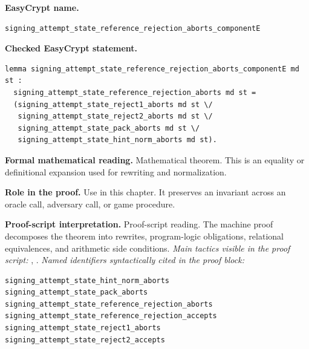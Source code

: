 \begin{formaltheorem}
\noindent\textbf{EasyCrypt name.}
\begin{lstlisting}[language=EasyCrypt,basicstyle=\ttfamily\scriptsize]
signing_attempt_state_reference_rejection_aborts_componentE
\end{lstlisting}
\noindent\textbf{Checked EasyCrypt statement.}
\begin{lstlisting}[language=EasyCrypt,basicstyle=\ttfamily\scriptsize]
lemma signing_attempt_state_reference_rejection_aborts_componentE md st :
  signing_attempt_state_reference_rejection_aborts md st =
  (signing_attempt_state_reject1_aborts md st \/
   signing_attempt_state_reject2_aborts md st \/
   signing_attempt_state_pack_aborts md st \/
   signing_attempt_state_hint_norm_aborts md st).
\end{lstlisting}
\noindent\textbf{Formal mathematical reading.}
Mathematical theorem. This is an equality or definitional expansion used for rewriting and normalization.

\noindent\textbf{Role in the proof.}
Use in this chapter. It preserves an invariant across an oracle call, adversary call, or game procedure.

\noindent\textbf{Proof-script interpretation.}
Proof-script reading. The machine proof decomposes the theorem into rewrites, program-logic obligations, relational equivalences, and arithmetic side conditions.
\emph{Main tactics visible in the proof script:} , .
\emph{Named identifiers syntactically cited in the proof block:}
\begin{lstlisting}[language=EasyCrypt,basicstyle=\ttfamily\scriptsize]
signing_attempt_state_hint_norm_aborts
signing_attempt_state_pack_aborts
signing_attempt_state_reference_rejection_aborts
signing_attempt_state_reference_rejection_accepts
signing_attempt_state_reject1_aborts
signing_attempt_state_reject2_accepts
\end{lstlisting}

\end{formaltheorem}

